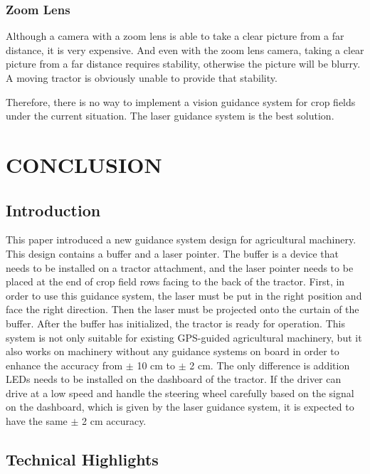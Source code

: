 \documentclass[letterpaper,12pt,oneside]{book}
\begin{document}
		\subsection{Zoom Lens}
			
		Although a camera with a zoom lens is able to take a clear picture from a far distance, it is very expensive. And even with the zoom lens camera, taking a clear picture from a far distance requires stability, otherwise the picture will be blurry. A moving tractor is obviously unable to provide that stability.
			
		Therefore, there is no way to implement a vision guidance system for crop fields under the current situation. The laser guidance system is the best solution.
		\fi
		
		\chapter{CONCLUSION}
		
		\section{Introduction}
		This paper introduced a new guidance system design for agricultural machinery. This design contains a buffer and a laser pointer. The buffer is a device that needs to be installed on a tractor attachment, and the laser pointer needs to be placed at the end of crop field rows facing to the back of the tractor. First, in order to use this guidance system, the laser must be put in the right position and face the right direction. Then the laser must be projected onto the curtain of the buffer. After the buffer has initialized, the tractor is ready for operation. This system is not only suitable for existing GPS-guided agricultural machinery, but it also works on machinery without any guidance systems on board in order to enhance the accuracy from $\pm$ 10 cm to $\pm$ 2 cm. The only difference is addition LEDs needs to be installed on the dashboard of the tractor. If the driver can drive at a low speed and handle the steering wheel carefully based on the signal on the dashboard, which is given by the laser guidance system, it is expected to have the same $\pm$ 2 cm accuracy. 
		
		
		\section{Technical Highlights}
		
\end{document}
